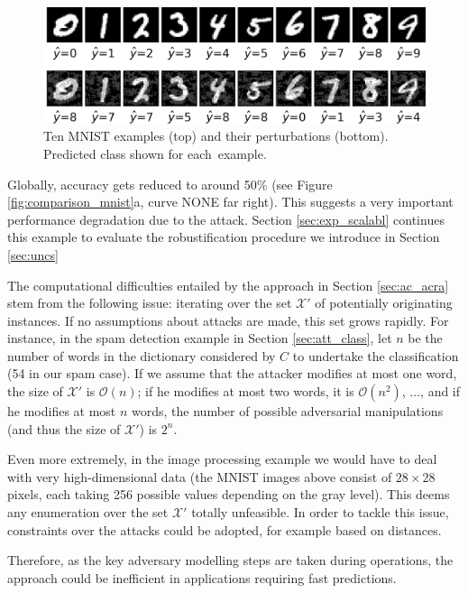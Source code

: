 \begin{figure}[H]
\centering
  \includegraphics[scale=1.]{figures/10samples.png}
  \caption{Ten MNIST examples (top) and their perturbations (bottom). Predicted class shown for each~example.}
  \label{fig:10samples}
\end{figure}


Globally, accuracy gets reduced to around 50\% (see Figure \ref{fig:comparison_mnist}a, curve NONE far right). This suggests a very important performance degradation due to the attack. Section \ref{sec:exp_scalabl} continues this example to evaluate the robustification procedure we introduce in Section  \ref{sec:uncs}

The computational difficulties entailed by 
the approach in Section \ref{sec:ac_acra} stem from the following issue:
iterating over the set $\mathcal{X}'$ of potentially
originating instances.  
 If no assumptions about attacks are made, this set grows rapidly.
 For instance, in the spam detection example in Section \ref{sec:att_class}, 
 let $n$ be the number of words in the dictionary considered by
 $C$ to undertake the classification (54 in our spam case). If 
 we assume that the attacker modifies at most one word,
 the size of $\mathcal{X}'$ is $\mathcal{O}(n)$; if he modifies at most two words, it is $\mathcal{O}(n^2)$, $\dots$, and 
 if he modifies at most $n$ words, 
 the number of possible adversarial manipulations (and thus the size of $\mathcal{X}'$) is $2^n$.
 
   Even more extremely, in the 
 image processing example we would have to deal with
 very high-dimensional data (the MNIST images above consist of $28 \times 28$ pixels, each taking 256 possible values depending on the gray level). 
 This deems any enumeration over the set $\mathcal{X}'$ totally unfeasible. In order to tackle this issue,
 constraints over the attacks could be adopted, for example 
 based on distances.
 
  
 Therefore, as the key adversary modelling steps are taken during operations,
 the approach could be inefficient in applications requiring fast predictions.
  
